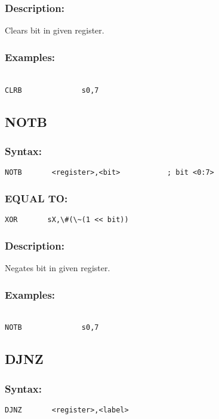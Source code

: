         \subsubsection{Description:}
            Clears bit in given register.

        \subsubsection{Examples:}
        {
            ~\\
            \usecodefont
            \verb'CLRB              s0,7'\\
        }

    \subsection{NOTB}
        \subsubsection{Syntax:}
            \verb'NOTB       <register>,<bit>           ; bit <0:7>'

        \subsubsection{EQUAL TO:}
            \verb'XOR       sX,\#(\~(1 << bit))'

        \subsubsection{Description:}
            Negates bit in given register.

        \subsubsection{Examples:}
        {
            ~\\
            \usecodefont
            \verb'NOTB              s0,7'\\
        }

    \subsection{DJNZ}
        \subsubsection{Syntax:}
            \verb'DJNZ       <register>,<label>'

